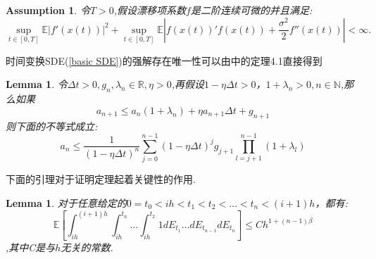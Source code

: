 \documentclass[12pt,final]{article}
\numberwithin{equation}{section}
\numberwithin{figure}{section}
\numberwithin{table}{section}
\theoremstyle{plain}
\newtheorem{lemma}[theorem]{Lemma}      %
\newtheorem{assumption}[theorem]{Assumption} %
\theoremstyle{definition}
\theoremstyle{remark}
\begin{document}
\begin{assumption}\label{assum3}
	令$T>0$,假设漂移项系数$f$是二阶连续可微的并且满足:
	\begin{equation}
		\sup\limits_{t\in[0,T]}\mathbb{E}\left|f'(x(t))\right|^2+
		\sup\limits_{t\in[0,T]}\mathbb{E}\left|f(x(t))'f(x(t))+
		\frac{\sigma^2}2f''(x(t))\right|<\infty.
	\end{equation}
\end{assumption}
时间变换SDE(\ref{basic SDE})的强解存在唯一性可以由\cite{kobayashi2011stochastic}中的定理4.1直接得到
\begin{lemma}\label{lemma:1}
	令$\Delta t > 0,g_n,\lambda _n \in \mathbb{R},\eta > 0$,再假设$1-\eta \Delta t > 0$，$1 + \lambda _n > 0,n \in \mathbb{N}$,那么如果
	\begin{equation*}
		a_{n+1} \leq a_n(1+\lambda _n)+\eta a_{n+1}\Delta t +g_{n+1}
	\end{equation*}
	则下面的不等式成立:
	\begin{equation}
		a_n \leq \frac{1}{(1-\eta\Delta t)^n}\sum\limits_{j=0}^{n-1}(1-\eta\Delta t)^jg_{j+1}\prod\limits_{l=j+1}^{n-1}(1+\lambda _l)
	\end{equation}
\end{lemma}
下面的引理对于证明定理起着关键性的作用.
\begin{lemma}\label{lemma:2}
	对于任意给定的$0 = t_0 < ih < t_1 < t_2 < \ldots <t_n <(i+1)h$，都有:
	\begin{equation}
		\mathbb{E}\left[\int_{ih}^{(i+1)h}
		\int_{ih}^{t_n} \ldots \int_{ih}^{t_2} 1 dE_{t_1} \ldots dE_{t_{n-1}}dE_{t_n}\right] \le Ch^{1+(n-1)\beta}
	\end{equation}
	,其中C是与$h$无关的常数.
\end{lemma}
\end{document}
